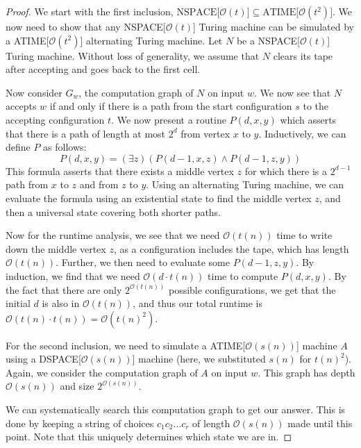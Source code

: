 \begin{proof}
    We start with the first inclusion, $\text{NSPACE[$\mathcal{O}(t)$]} \subseteq \text{ATIME[$\mathcal{O}(t^2)$]}$.
    We now need to show that any NSPACE[$\mathcal{O}(t)$] Turing machine can be simulated by a ATIME[$\mathcal{O}(t^2)$] alternating Turing machine.
    Let $N$ be a NSPACE[$\mathcal{O}(t)$] Turing machine.
    Without loss of generality, we assume that $N$ clears its tape after accepting and goes back to the first cell.

    Now consider $G_w$, the computation graph of $N$ on input $w$.
    We now see that $N$ accepts $w$ if and only if there is a path from the start configuration $s$ to the accepting configuration $t$.
    We now present a routine $P(d, x, y)$ which asserts that there is a path of length at most $2^{d}$ from vertex $x$ to $y$.
    Inductively, we can define $P$ as follows:
    \[
        P(d, x, y) = (\exists z)(P(d - 1, x, z) \land P(d - 1, z, y))
    \]
    This formula asserts that there exists a middle vertex $z$ for which there is a $2^{d - 1}$ path from $x$ to $z$ and from $z$ to $y$.
    Using an alternating Turing machine, we can evaluate the formula using an existential state to find the middle vertex $z$, and then a universal state covering both shorter paths.

    Now for the runtime analysis, we see that we need $\mathcal{O}(t(n))$ time to write down the middle vertex $z$, as a configuration includes the tape, which has length $\mathcal{O}(t(n))$.
    Further, we then need to evaluate some $P(d - 1, z, y)$.
    By induction, we find that we need $\mathcal{O}(d\cdot t(n))$ time to compute $P(d, x, y)$.
    By the fact that there are only $2^{\mathcal{O}(t(n))}$ possible configurations, we get that the initial $d$ is also in $\mathcal{O}(t(n))$, and thus our total runtime is $\mathcal{O}(t(n)\cdot t(n)) = \mathcal{O}(t(n)^2)$.

    For the second inclusion, we need to simulate a ATIME[$\mathcal{O}(s(n))$] machine $A$ using a DSPACE[$\mathcal{O}(s(n))$] machine (here, we substituted $s(n)$ for $t(n)^2$).
    Again, we consider the computation graph of $A$ on input $w$.
    This graph has depth $\mathcal{O}(s(n))$ and size $2^{\mathcal{O}(s(n))}$.

    We can systematically search this computation graph to get our answer.
    This is done by keeping a string of choices $c_{1}c_{2}\dots c_r$ of length $\mathcal{O}(s(n))$ made until this point.
    Note that this uniquely determines which state we are in.


\end{proof}

